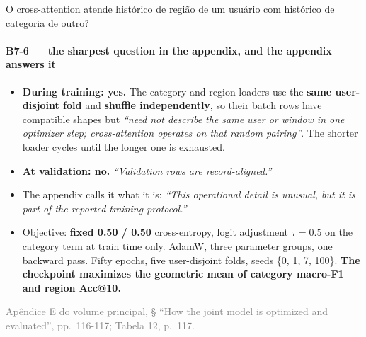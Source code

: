\documentclass{beamer}
\begin{document}
\begin{frame}[noframenumbering]{O cross-attention atende histórico de região de um usuário com histórico de categoria de outro?}
    \framesubtitle{B7-6 --- the sharpest question in the appendix, and the appendix answers it}
    \hypertarget{b76}{}
    \small
    \begin{itemize}\setlength{\itemsep}{0pt}\setlength{\parskip}{0pt}
        \item \textcolor{alert}{\textbf{During training: yes.}} The category and region loaders use the \textbf{same user-disjoint fold} and \textbf{shuffle independently}, so their batch rows have compatible shapes but \textit{``need not describe the same user or window in one optimizer step; cross-attention operates on that random pairing''}. The shorter loader cycles until the longer one is exhausted.
        \item \textbf{At validation: no.} \textit{``Validation rows are record-aligned.''}
        \item The appendix calls it what it is: \textit{``This operational detail is unusual, but it is part of the reported training protocol.''}
        \item Objective: \textbf{fixed 0.50 / 0.50} cross-entropy, logit adjustment $\tau = 0.5$ on the category term at train time only. AdamW, three parameter groups, one backward pass. Fifty epochs, five user-disjoint folds, seeds \{0, 1, 7, 100\}. \textbf{The checkpoint maximizes the geometric mean of category macro-F1 and region Acc@10.}
    \end{itemize}
    \vfill
    {\scriptsize
    \begin{minipage}[b]{0.775\linewidth}\raggedright\textcolor{gray}{Apêndice E do volume principal, § ``How the joint model is optimized and evaluated'', pp.~116-117; Tabela 12, p.~117.}\end{minipage}\hfill
    \begin{minipage}[b]{0.20\linewidth}\raggedleft \hyperlink{b0}{}\end{minipage}}
\end{frame}
\end{document}
